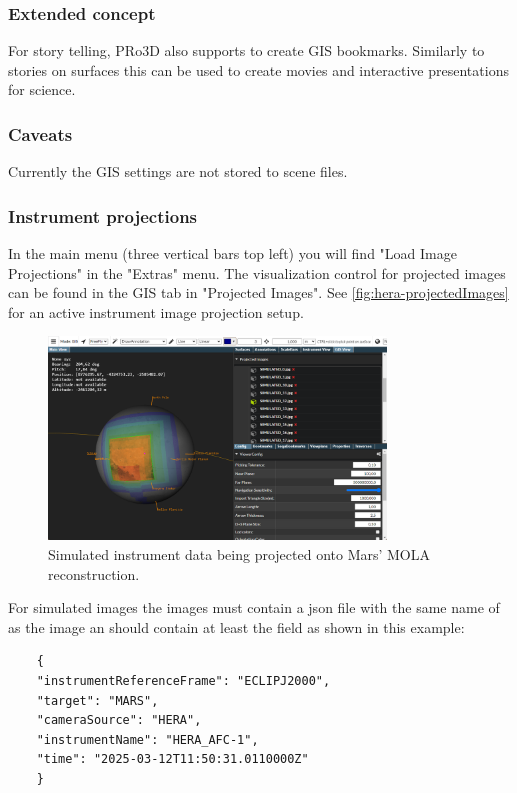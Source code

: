 \hypertarget{extended-concept}{%
	\subsubsection{Extended concept}\label{extended-concept}}

For story telling, PRo3D also supports to create GIS bookmarks.
Similarly to stories on surfaces this can be used to create movies and
interactive presentations for science.

\hypertarget{caveats}{%
	\subsubsection{Caveats}\label{caveats}}

Currently the GIS settings are not stored to scene files.

\subsubsection{Instrument projections}
\label{sec:instrumentProjections}

In the main menu (three vertical bars top left) you will find "Load Image Projections" in the "Extras" menu.
The visualization control for projected images can be found in the GIS tab in "Projected Images".
See \autoref{fig:hera-projectedImages} for an active instrument image projection setup.

\begin{figure}[h!]
	\centering
	\includegraphics[width=0.8\textwidth]{pics/hera-projectedImages.png}
	\caption{Simulated instrument data being projected onto Mars' MOLA reconstruction.}
	\label{fig:hera-projectedImages}
\end{figure}

For simulated images the images must contain a json file with the same name of as the image an should contain at least the field as shown in this example:
\begin{verbatim}
	{
	"instrumentReferenceFrame": "ECLIPJ2000",
	"target": "MARS",
	"cameraSource": "HERA",
	"instrumentName": "HERA_AFC-1",
	"time": "2025-03-12T11:50:31.0110000Z"
	}
\end{verbatim}


